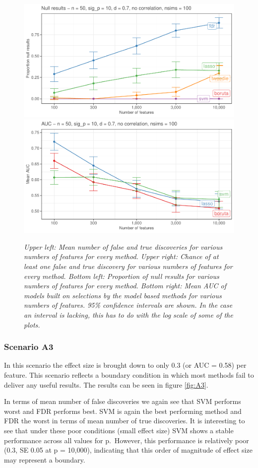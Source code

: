 \documentclass[
]{article}
\begin{document}
\begin{figure}

{\centering \includegraphics[width=0.49\linewidth]{main_files/figure-latex/A2-1} \includegraphics[width=0.49\linewidth]{main_files/figure-latex/A2-2} 

}

\caption{\textit{Upper left: Mean number of false and true discoveries for various numbers of features for every method. Upper right: Chance of at least one false and true discovery for various numbers of features for every method. Bottom left: Proportion of null results for various numbers of features for every method. Bottom right: Mean AUC of models built on selections by the model based methods for various numbers of features. 95\% confidence intervals are shown. In the case an interval is lacking, this has to do with the log scale of some of the plots.}}\label{fig:A2}
\end{figure}

\hypertarget{scenario-a3}{%
\subsubsection{Scenario A3}\label{scenario-a3}}

In this scenario the effect size is brought down to only 0.3 (or AUC = 0.58) per feature. This scenario reflects a boundary condition in which most methods fail to deliver any useful results. The results can be seen in figure \ref{fig:A3}.

In terms of mean number of false discoveries we again see that SVM performs worst and FDR performs best. SVM is again the best performing method and FDR the worst in terms of mean number of true discoveries. It is interesting to see that under these poor conditions (small effect size) SVM shows a stable performance across all values for p.~However, this performance is relatively poor (0.3, SE 0.05 at p = 10,000), indicating that this order of magnitude of effect size may represent a boundary.
\end{document}
